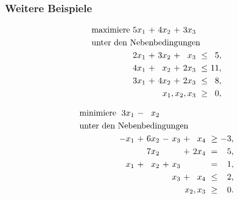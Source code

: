 \documentclass[smaller]{beamer}
\begin{document}
\begin{frame}
 \frametitle{Weitere Beispiele}
 \begin{align} \label{eq:1.1}
\begin{alignedat}{5}
& \text{maximiere } & 5x_1 &\ + &\ 4x_2 &\ + &\ 3x_3 & & \\
& \rlap{unter den Nebenbedingungen} & & & & & & & \\
&& 2x_1 &\ + &\ 3x_2 &\ + &\  x_3 &\ \leq &\  5,\ \\
&& 4x_1 &\ + &\  x_2 &\ + &\ 2x_3 &\ \leq &\ 11,\ \\
&& 3x_1 &\ + &\ 4x_2 &\ + &\ 2x_3 &\ \leq &\  8,\ \\
&& & & & & \llap{$x_1, x_2, x_3$} &\ \geq &\  0,\
\end{alignedat}
\end{align}

\begin{align} \label{eq:1.2}
\begin{alignedat}{6}
& \text{minimiere } & 3x_1 &\ - &\ x_2 & & & & & & \\
& \rlap{unter den Nebenbedingungen} & & & & & & & &  \\
&& -x_1 &\ + &\ 6x_2 &\ - &\  x_3 &\ + &\  x_4 &\ \geq &\ -3,\ \\
&&      &\   &\ 7x_2 &\   &\      &\ + &\ 2x_4 &\ =    &\  5,\ \\
&&  x_1 &\ + &\  x_2 &\ + &\  x_3 &\   &\      &\ =    &\  1,\ \\
&&      &\   &\      &\   &\  x_3 &\ + &\  x_4 &\ \leq &\  2,\ \\
&& & & & & & & \llap{$x_2, x_3$} &\ \geq &\  0.\
\end{alignedat}
\end{align}
\end{frame}
\end{document}

